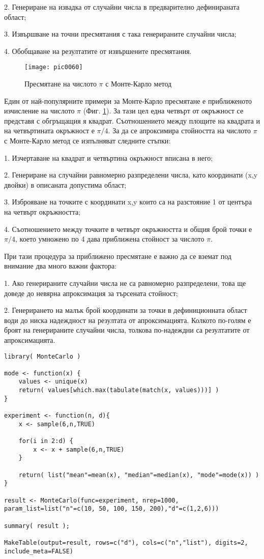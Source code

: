 2. Генериране на извадка от случайни числа в предварително дефинираната област;

3. Извършване на точни пресмятания с така генерираните случайни числа;

4. Обобщаване на резултатите от извършените пресмятания.

\begin{figure}[h!]
  \centering
  \texttt{[image: pic0060]}
  \caption{Пресмятане на числото $\pi$ с Монте-Карло метод}
\label{figure0060}
\end{figure}
\FloatBarrier

Един от най-популярните примери за Монте-Карло пресмятане е приближеното изчисление на числото $\pi$ (Фиг. \ref{figure0060}). За тази цел една четвърт от окръжност се представя с обгръщащия я квадрат. Съотношението между площите на квадрата и на четвъртината окръжност е $\pi/4$. За да се апроксимира стойността на числото $\pi$ с Монте-Карло метод се изпълняват следните стъпки:

1. Изчертаване на квадрат и четвъртина окръжност вписана в него;

2. Генериране на случайни равномерно разпределени числа, като координати (x,y двойки) в описаната допустима област;

3. Изброяване на точките с координати x,y които са на разстояние 1 от центъра на четвърт окръжността; 

4. Съотношението между точките в четвърт окръжността и общия брой точки е $\pi/4$, което умножено по 4 дава приближена стойност за числото $\pi$. 

При тази процедура за приближено пресмятане е важно да се вземат под внимание два много важни фактора:

1. Ако генерираните случайни числа не са равномерно разпределени, това ще доведе до невярна апроксимация за търсената стойност;

2. Генерирането на малък брой координати за точки в дефиниционната област води до ниска надеждност на резултата от апроксимацията. Колкото по-голям е броят на генерираните случайни числа, толкова по-надеждни са резултатите от апроксимацията.

\begin{lstlisting}[caption=Монте-Карло пресмятане, label=listing0175]
library( MonteCarlo )

mode <- function(x) {
	values <- unique(x)
	return( values[which.max(tabulate(match(x, values)))] )
}

experiment <- function(n, d){
	x <- sample(6,n,TRUE)

	for(i in 2:d) {
		x <- x + sample(6,n,TRUE)
	}

	return( list("mean"=mean(x), "median"=median(x), "mode"=mode(x)) )
}

result <- MonteCarlo(func=experiment, nrep=1000, param_list=list("n"=c(10, 50, 100, 150, 200),"d"=c(1,2,6)))

summary( result );

MakeTable(output=result, rows=c("d"), cols=c("n","list"), digits=2, include_meta=FALSE)
\end{lstlisting}

